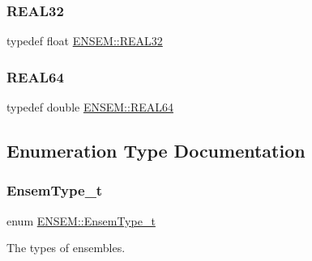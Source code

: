\mbox{\label{namespaceENSEM_a7540d01191172323e9073283d772576d}} 
\subsubsection{\texorpdfstring{REAL32}{REAL32}}
{\footnotesize\ttfamily typedef float \mbox{\hyperlink{namespaceENSEM_a7540d01191172323e9073283d772576d}{E\+N\+S\+E\+M\+::\+R\+E\+A\+L32}}}

\mbox{\label{namespaceENSEM_a85b215b9f1f43715aebee01718e25082}} 
\subsubsection{\texorpdfstring{REAL64}{REAL64}}
{\footnotesize\ttfamily typedef double \mbox{\hyperlink{namespaceENSEM_a85b215b9f1f43715aebee01718e25082}{E\+N\+S\+E\+M\+::\+R\+E\+A\+L64}}}



\subsection{Enumeration Type Documentation}
\mbox{\label{namespaceENSEM_a2dc2c4a26884f343471e52f23479ddbe}} 
\subsubsection{\texorpdfstring{EnsemType\_t}{EnsemType\_t}\hspace{0.1cm}{\footnotesize\ttfamily [1/2]}}
{\footnotesize\ttfamily enum \mbox{\hyperlink{namespaceENSEM_a2dc2c4a26884f343471e52f23479ddbe}{E\+N\+S\+E\+M\+::\+Ensem\+Type\+\_\+t}}}



The types of ensembles. 

